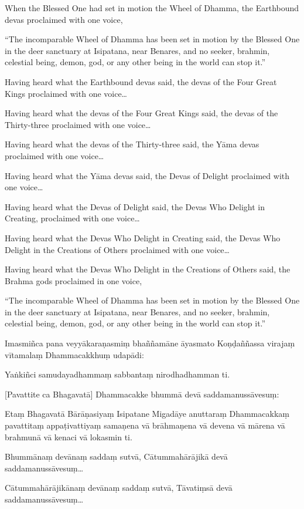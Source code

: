 When the Blessed One had set in motion the Wheel of Dhamma, the
Earthbound devas proclaimed with one voice,

``The incomparable Wheel of Dhamma has been set in motion by the Blessed
One in the deer sanctuary at Isipatana, near Benares, and no seeker,
brahmin, celestial being, demon, god, or any other being in the world
can stop it.''

Having heard what the Earthbound devas said, the devas of the Four Great
Kings proclaimed with one voice\ldots

Having heard what the devas of the Four Great Kings said, the devas of
the Thirty-three proclaimed with one voice\ldots

Having heard what the devas of the Thirty-three said, the Yāma devas
proclaimed with one voice\ldots

Having heard what the Yāma devas said, the Devas of Delight proclaimed
with one voice\ldots

Having heard what the Devas of Delight said, the Devas Who Delight in
Creating, proclaimed with one voice\ldots

Having heard what the Devas Who Delight in Creating said, the Devas Who
Delight in the Creations of Others proclaimed with one voice\ldots

Having heard what the Devas Who Delight in the Creations of Others said,
the Brahma gods proclaimed in one voice,

``The incomparable Wheel of Dhamma has been set in motion by the Blessed
One in the deer sanctuary at Isipatana, near Benares, and no seeker,
brahmin, celestial being, demon, god, or any other being in the world
can stop it.''

\clearpage

\paliText

Imasmiñca pana veyyākaraṇasmiṃ bhaññamāne āyasmato Koṇḍaññassa virajaṃ
vītamalaṃ Dhammacakkhuṃ udapādi:

Yaṅkiñci samudayadhammaṃ sabbantaṃ nirodhadhamman ti.

[Pavattite ca Bhagavatā] Dhammacakke bhummā devā saddamanussāvesuṃ:

Etaṃ Bhagavatā Bārāṇasiyaṃ Isipatane Migadāye anuttaraṃ Dhammacakkaṃ
pavattitaṃ appaṭivattiyaṃ samaṇena vā brāhmaṇena vā devena vā mārena vā
brahmunā vā kenaci vā lokasmin ti.

Bhummānaṃ devānaṃ saddaṃ sutvā, Cātummahārājikā devā
saddamanussāvesuṃ\ldots

Cātummahārājikānaṃ devānaṃ saddaṃ sutvā, Tāvatiṃsā devā
saddamanussāvesuṃ\ldots


